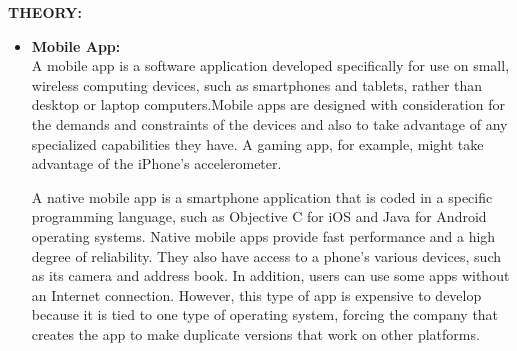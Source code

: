 \documentclass[a4paper,12pt]{article}
\begin{document}
\noindent \textbf{THEORY:}	\\
\begin{itemize}
\item \textbf{Mobile App:}\\
A mobile app is a software application developed specifically for use on small, wireless computing devices, such as smartphones and tablets, rather than desktop or laptop computers.Mobile apps are designed with consideration for the demands and constraints of the devices and also to take advantage of any specialized capabilities they have. A gaming app, for example, might take advantage of the iPhone's accelerometer. 

A native mobile app is a smartphone application that is coded in a specific programming language, such as Objective C for iOS and Java for Android operating systems. Native mobile apps provide fast performance and a high degree of reliability. They also have access to a phone's various devices, such as its camera and address book. In addition, users can use some apps without an Internet connection. However, this type of app is expensive to develop because it is tied to one type of operating system, forcing the company that creates the app to make duplicate versions that work on other platforms.
\end{itemize}
\end{document}
